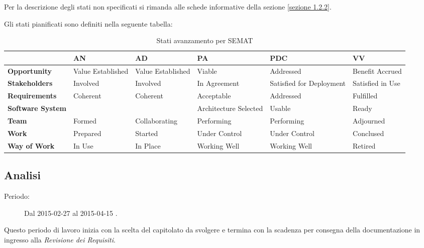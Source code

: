 \noindent Per la descrizione degli stati non specificati si rimanda alle schede informative della sezione \ref{sezione 1.2.2}.

\noindent Gli stati pianificati sono definiti nella seguente tabella:
\begin{table}[h]
\centering
\begin{tabular}{|l|p{}|p{}|p{}|p{}|p{}|}
	\toprule
		 & AN & AD & PA & PDC & VV \\
	\midrule
	\midrule
		\textbf{Opportunity} & Value Established & Value Established & Viable & Addressed & Benefit Accrued \\
	\midrule
		\textbf{Stakeholders} & Involved & Involved & In Agreement & Satisfied for Deployment & Satisfied in Use \\
	\midrule
		\textbf{Requirements} & Coherent & Coherent & Acceptable & Addressed & Fulfilled \\
	\midrule
		\textbf{Software System} & & & Architecture Selected & Usable & Ready \\
	\midrule
		\textbf{Team} & Formed & Collaborating & Performing & Performing & Adjourned \\     	 
	\midrule
		\textbf{Work} & Prepared & Started & Under Control & Under Control & Conclused \\
	\midrule
		\textbf{Way of Work} & In Use & In Place & Working Well & Working Well & Retired  \\  
	\bottomrule 
\end{tabular}
\caption{Stati avanzamento per SEMAT}
\end{table}

\subsection{Analisi}
\begin{description}
	\item[Periodo:] Dal 2015-02-27 al 2015-04-15 .
\end{description}
Questo periodo di lavoro inizia con la scelta del capitolato da svolgere e termina con la scadenza per consegna della documentazione in ingresso alla \textit{Revisione dei Requisiti}. 

